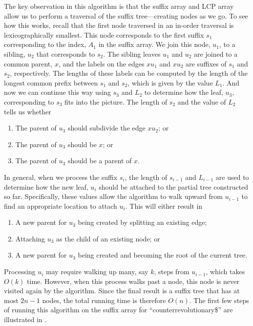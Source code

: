 The key observation in this algorithm is that the suffix array and LCP array allow us to perform a traversal of the suffix tree---creating nodes as we go.  To see how this works, recall that the first node traversed in an in-order traversal is lexicographically smallest.  This node corresponds to the first suffix $s_1$ corresponding to the index, $A_1$ in the suffix array.  We join this node, $u_1$, to a sibling, $u_2$ that corresponds to $s_2$.  The sibling leaves $u_1$ and $u_2$ are joined to a common parent, $x$, and the labels on the edges $xu_1$ and $xu_2$ are suffixes of $s_1$ and $s_2$, respectively.  The lengths of these labels can be computed by the length of the longest common prefix between $s_1$ and $s_2$, which is given by the value $L_1$.  And now we can continue this way using $s_3$ and $L_2$ to determine how the leaf, $u_3$, corresponding to $s_3$ fits into the picture.  The length of $s_2$ and the value of $L_2$ tells us whether
\begin{enumerate}
  \item The parent of $u_3$ should subdivide the edge $xu_2$; or
  \item The parent of $u_3$ should be $x$; or
  \item The parent of $u_3$ should be a parent of $x$.
\end{enumerate}
In general, when we process the suffix $s_i$, the length of $s_{i-1}$ and $L_{i-1}$ are used to determine how the new leaf, $u_i$ should be attached to the partial tree constructed so far.  Specifically, these values allow the algorithm to walk upward from $u_{i-1}$ to find an appropriate location to attach $u_i$.  This will either result in
\begin{enumerate}
  \item A new parent for $u_3$ being created by splitting an existing edge;
  \item Attaching $u_3$ as the child of an existing node; or
  \item A new parent for $u_3$ being created and becoming the root of the current tree.
\end{enumerate}
Processing $u_i$ may require walking up many, say $k$, steps from $u_{i-1}$,
which takes $O(k)$ time. However, when this process walks past a node, this node is never visited again by the algorithm. Since the final result is a suffix tree that has at most $2n-1$ nodes, the total running time is therefore $O(n)$. The first few steps of running this algorithm on the suffix array for ``counterrevolutionary\$'' are illustrated in .

